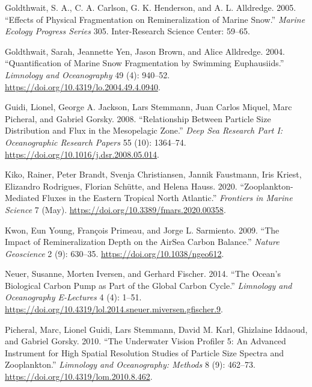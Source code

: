 \documentclass[]{article}
\begin{document}
\leavevmode\hypertarget{ref-goldthwaitEffectsPhysicalFragmentation2005}{}%
Goldthwait, S. A., C. A. Carlson, G. K. Henderson, and A. L. Alldredge.
2005. ``Effects of Physical Fragmentation on Remineralization of Marine
Snow.'' \emph{Marine Ecology Progress Series} 305. Inter-Research
Science Center: 59--65.

\leavevmode\hypertarget{ref-goldthwaitQuantificationMarineSnow2004}{}%
Goldthwait, Sarah, Jeannette Yen, Jason Brown, and Alice Alldredge.
2004. ``Quantification of Marine Snow Fragmentation by Swimming
Euphausiids.'' \emph{Limnology and Oceanography} 49 (4): 940--52.
\url{https://doi.org/10.4319/lo.2004.49.4.0940}.

\leavevmode\hypertarget{ref-guidiRelationshipParticleSize2008}{}%
Guidi, Lionel, George A. Jackson, Lars Stemmann, Juan Carlos Miquel,
Marc Picheral, and Gabriel Gorsky. 2008. ``Relationship Between Particle
Size Distribution and Flux in the Mesopelagic Zone.'' \emph{Deep Sea
Research Part I: Oceanographic Research Papers} 55 (10): 1364--74.
\url{https://doi.org/10.1016/j.dsr.2008.05.014}.

\leavevmode\hypertarget{ref-kikoZooplanktonMediatedFluxesEastern2020}{}%
Kiko, Rainer, Peter Brandt, Svenja Christiansen, Jannik Faustmann, Iris
Kriest, Elizandro Rodrigues, Florian Schütte, and Helena Hauss. 2020.
``Zooplankton-Mediated Fluxes in the Eastern Tropical North Atlantic.''
\emph{Frontiers in Marine Science} 7 (May).
\url{https://doi.org/10.3389/fmars.2020.00358}.

\leavevmode\hypertarget{ref-kwonImpactRemineralizationDepth2009}{}%
Kwon, Eun Young, François Primeau, and Jorge L. Sarmiento. 2009. ``The
Impact of Remineralization Depth on the AirSea Carbon Balance.''
\emph{Nature Geoscience} 2 (9): 630--35.
\url{https://doi.org/10.1038/ngeo612}.

\leavevmode\hypertarget{ref-neuerOceanBiologicalCarbon2014}{}%
Neuer, Susanne, Morten Iversen, and Gerhard Fischer. 2014. ``The Ocean's
Biological Carbon Pump as Part of the Global Carbon Cycle.''
\emph{Limnology and Oceanography E-Lectures} 4 (4): 1--51.
\url{https://doi.org/10.4319/lol.2014.sneuer.miversen.gfischer.9}.

\leavevmode\hypertarget{ref-picheralUnderwaterVisionProfiler2010}{}%
Picheral, Marc, Lionel Guidi, Lars Stemmann, David M. Karl, Ghizlaine
Iddaoud, and Gabriel Gorsky. 2010. ``The Underwater Vision Profiler 5:
An Advanced Instrument for High Spatial Resolution Studies of Particle
Size Spectra and Zooplankton.'' \emph{Limnology and Oceanography:
Methods} 8 (9): 462--73. \url{https://doi.org/10.4319/lom.2010.8.462}.
\end{document}
